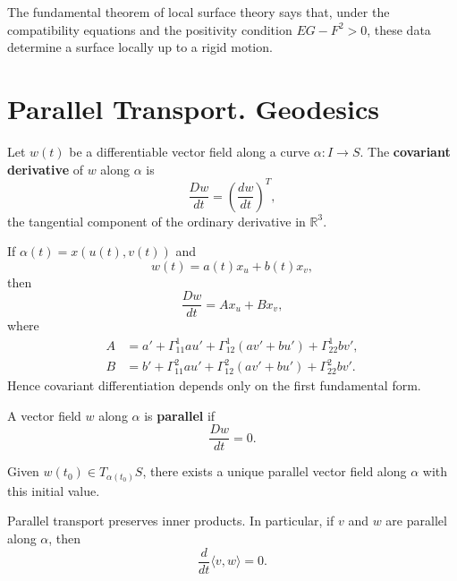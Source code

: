 \documentclass[12pt, oneside]{book}
\begin{document}
\begin{remark}
    The fundamental theorem of local surface theory says that, under the
    compatibility equations and the positivity condition $EG-F^2>0$, these
    data determine a surface locally up to a rigid motion.
\end{remark}

\section{Parallel Transport. Geodesics}

\begin{definition}
    Let $w(t)$ be a differentiable vector field along a curve
    $\alpha:I\rightarrow S$.  The \textbf{covariant derivative} of $w$ along
    $\alpha$ is
    \[
        \frac{Dw}{dt}
        =
        \left(\frac{dw}{dt}\right)^T,
    \]
    the tangential component of the ordinary derivative in $\mathbb{R}^3$.
\end{definition}

\begin{remark}
    If $\alpha(t)=x(u(t),v(t))$ and
    \[
        w(t)=a(t)x_u+b(t)x_v,
    \]
    then
    \[
        \frac{Dw}{dt}
        =
        A x_u+B x_v,
    \]
    where
    \[
        \begin{aligned}
            A & = a'
            +\Gamma_{11}^1au'
            +\Gamma_{12}^1(av'+bu')
            +\Gamma_{22}^1bv', \\
            B & = b'
            +\Gamma_{11}^2au'
            +\Gamma_{12}^2(av'+bu')
            +\Gamma_{22}^2bv'.
        \end{aligned}
    \]
    Hence covariant differentiation depends only on the first fundamental form.
\end{remark}

\begin{definition}
    A vector field $w$ along $\alpha$ is \textbf{parallel} if
    \[
        \frac{Dw}{dt}=0.
    \]
\end{definition}

\begin{proposition}
    Given $w(t_0)\in T_{\alpha(t_0)}S$, there exists a unique parallel vector
    field along $\alpha$ with this initial value.
\end{proposition}

\begin{proposition}
    Parallel transport preserves inner products.  In particular, if $v$ and $w$
    are parallel along $\alpha$, then
    \[
        \frac{d}{dt}\langle v,w\rangle=0.
    \]
\end{proposition}
\end{document}

